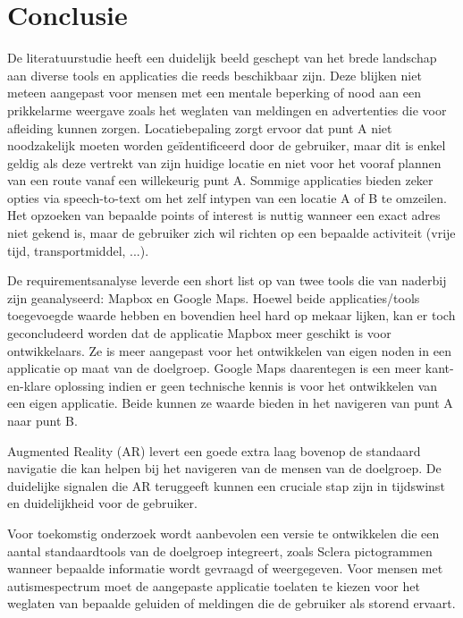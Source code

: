 
\chapter{Conclusie}%
\label{ch:conclusie}



De literatuurstudie heeft een duidelijk beeld geschept van het brede landschap aan diverse tools en applicaties die reeds beschikbaar zijn. Deze blijken niet meteen aangepast voor mensen met een mentale beperking of nood aan een prikkelarme weergave zoals het weglaten van meldingen en advertenties die voor afleiding kunnen zorgen. Locatiebepaling zorgt ervoor dat punt A niet noodzakelijk moeten worden geïdentificeerd door de gebruiker, maar dit is enkel geldig als deze vertrekt van zijn huidige locatie en niet voor het vooraf plannen van een route vanaf een willekeurig punt A. Sommige applicaties bieden zeker opties via speech-to-text om het zelf intypen van een locatie A of B te omzeilen. Het opzoeken van bepaalde points of interest is nuttig wanneer een exact adres niet gekend is, maar de gebruiker zich wil richten op een bepaalde activiteit (vrije tijd, transportmiddel, ...).  

De requirementsanalyse leverde een short list op van twee tools die van naderbij zijn geanalyseerd: Mapbox en Google Maps. Hoewel beide applicaties/tools toegevoegde waarde hebben en bovendien heel hard op mekaar lijken, kan er toch geconcludeerd worden dat de applicatie Mapbox meer geschikt is voor ontwikkelaars. Ze is meer aangepast voor het ontwikkelen van eigen noden in een applicatie op maat van de doelgroep. Google Maps daarentegen is een meer kant-en-klare oplossing indien er geen technische kennis is voor het ontwikkelen van een eigen applicatie. Beide kunnen ze waarde bieden in het navigeren van punt A naar punt B.

Augmented Reality (AR) levert een goede extra laag bovenop de standaard navigatie die kan helpen bij het navigeren van de mensen van de doelgroep. De duidelijke signalen die AR teruggeeft kunnen een cruciale stap zijn in tijdswinst en duidelijkheid voor de gebruiker.

Voor toekomstig onderzoek wordt aanbevolen een versie te ontwikkelen die een aantal standaardtools van de doelgroep integreert, zoals Sclera pictogrammen wanneer bepaalde informatie wordt gevraagd of weergegeven. Voor mensen met autismespectrum moet de aangepaste applicatie toelaten te kiezen voor het weglaten van bepaalde geluiden of meldingen die de gebruiker als storend ervaart. 